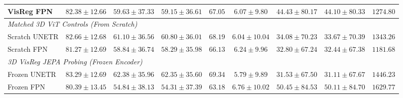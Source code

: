 \documentclass{article}
\begin{document}
\begin{table}[ht]
{\begin{tabular}{lcccccccc}
VisReg FPN & $82.38 \pm 12.66$ & $59.63 \pm 37.33$ & $59.15 \pm 36.61$ & $67.05$ & $6.07 \pm 9.80$ & $44.43 \pm 80.17$ & $44.10 \pm 80.33$ & $1274.80$ \\
\midrule
\multicolumn{9}{l}{\textit{Matched 3D ViT Controls (From Scratch)}} \\
Scratch UNETR & $82.66 \pm 12.68$ & $61.10 \pm 36.56$ & $60.80 \pm 36.01$ & $68.19$ & $6.04 \pm 10.04$ & $34.08 \pm 70.23$ & $33.67 \pm 70.39$ & $1343.26$ \\
Scratch FPN & $81.27 \pm 12.69$ & $58.84 \pm 36.74$ & $58.29 \pm 35.98$ & $66.13$ & $6.24 \pm 9.96$ & $32.80 \pm 67.24$ & $32.44 \pm 67.38$ & $1181.68$ \\
\midrule
\multicolumn{9}{l}{\textit{3D VisReg JEPA Probing (Frozen Encoder)}} \\
Frozen UNETR & $83.29 \pm 12.69$ & $62.38 \pm 35.96$ & $62.35 \pm 35.60$ & $69.34$ & $5.79 \pm 9.89$ & $31.53 \pm 67.50$ & $31.11 \pm 67.67$ & $1446.23$ \\
Frozen FPN & $80.39 \pm 13.45$ & $54.84 \pm 38.13$ & $54.31 \pm 37.39$ & $63.18$ & $6.76 \pm 10.02$ & $50.45 \pm 84.53$ & $50.11 \pm 84.70$ & $1629.77$ \\
\bottomrule
\end{tabular}%
}
\end{table}
\end{document}
